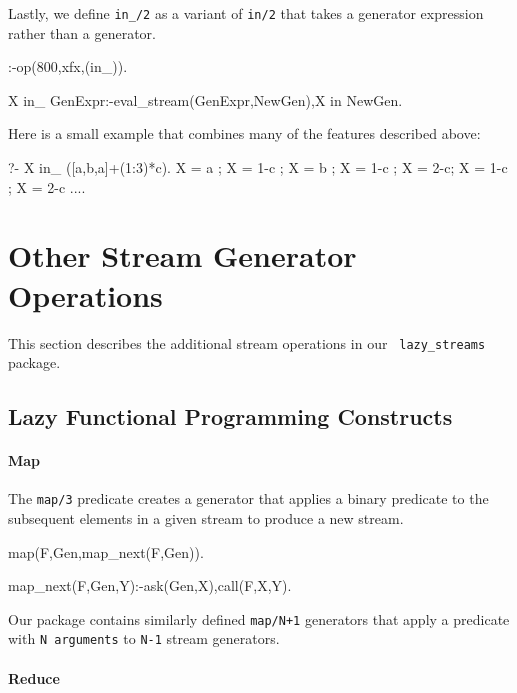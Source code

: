 \documentclass[submission,copyright,creativecommons]{eptcs}
\begin{document}
Lastly, we define {\tt in\_/2} as a variant of \texttt{in/2} that takes a 
generator expression rather than a generator.
\begin{code}
:-op(800,xfx,(in_)).

X in_ GenExpr:-eval_stream(GenExpr,NewGen),X in NewGen.     
\end{code}
Here is a small example that combines many of the features described above:
\begin{codex}
?- X in_ ({[a,b,a]}+(1:3)*c).
X = a ; X = 1-c ; X = b ; X = 1-c ; X = 2-c; X = 1-c ; X = 2-c ....
\end{codex}




\section{Other Stream Generator Operations}\label{other}

This section describes the additional stream operations in our {\tt
lazy\_streams} package.

\subsection{Lazy Functional Programming Constructs}\label{sec:other:fp}

\paragraph{Map}

The {\tt map/3} predicate creates a generator that applies a binary predicate
to the subsequent elements in a given stream to produce a new stream.
\begin{code}
map(F,Gen,map_next(F,Gen)).

map_next(F,Gen,Y):-ask(Gen,X),call(F,X,Y).
\end{code}

Our package contains similarly defined {\tt map/N+1} generators that
apply a predicate with {\tt N arguments} to
{\tt N-1} stream generators.

\paragraph{Reduce}
\end{document}
